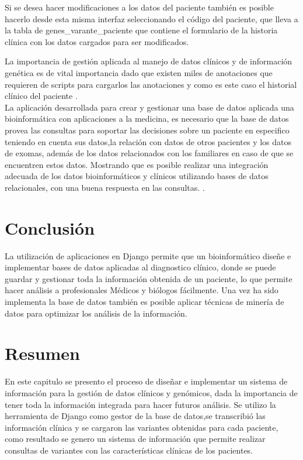 Si se desea hacer modificaciones a los datos del paciente también es posible hacerlo desde esta misma interfaz seleccionando el código del paciente, que lleva a la tabla de genes\_varante\_paciente que contiene el formulario de la historia clínica con los datos cargados para ser modificados. 

La importancia de gestión aplicada al manejo de datos clínicos y de información genética es de vital importancia dado que existen miles de anotaciones que requieren de scripts para cargarlos las anotaciones y como es este caso el historial clínico del paciente \cite{Paila2013}. \\

La aplicación desarrollada para crear y gestionar una base de datos aplicada una bioinformática con aplicaciones a la medicina, es necesario que la base de datos provea las consultas para soportar las decisiones sobre un paciente en especifico teniendo en cuenta sus datos,la relación con datos de otros pacientes y los datos de exomas, además de los datos relacionados con los familiares en caso de que se encuentren estos datos. Mostrando que es posible realizar una integración adecuada de los datos bioinformáticos y clínicos utilizando bases de datos relacionales, con una buena respuesta en las consultas. \cite{Sujansky2001}.

\section{Conclusión}

La utilización de aplicaciones en Django permite que un bioinformático diseñe e implementar bases de datos aplicadas al diagnostico clínico, donde se puede guardar y gestionar toda la información obtenida de un paciente, lo que permite hacer análisis a profesionales Médicos y biólogos fácilmente. Una vez ha sido implementa la base de datos también es posible aplicar técnicas de minería de datos para optimizar los análisis de la información. \\

\section*{Resumen}

En este capitulo se presento el proceso de diseñar e implementar un sistema de información para la gestión de datos clínicos y genómicos, dada la importancia de tener toda la información integrada para hacer futuros análisis. Se utilizo la herramienta de Django como gestor de la base de datos,se transcribió las información clínica y se cargaron las variantes obtenidas para cada paciente, como resultado se genero un sistema de información que permite realizar consultas de variantes con las características clínicas de los pacientes.   